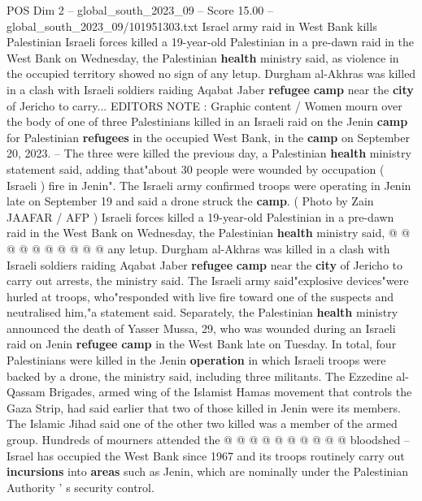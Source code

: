 \begin{textsample}{POS Dim 2 – global\_south\_2023\_09 – Score 15.00 – global\_south\_2023\_09/101951303.txt}  \label{ex:f2_pos_441}
Israel army raid in West Bank kills Palestinian Israeli forces killed a 19-year-old Palestinian in a pre-dawn raid in the West Bank on Wednesday, the Palestinian \textbf{health} ministry said, as violence in the occupied territory showed no sign of any letup.
Durgham al-Akhras was killed in a clash with Israeli soldiers raiding Aqabat Jaber \textbf{refugee} \textbf{camp} near the \textbf{city} of Jericho to carry...
EDITORS NOTE : Graphic content / Women mourn over the body of one of three Palestinians killed in an Israeli raid on the Jenin \textbf{camp} for Palestinian \textbf{refugees} in the occupied West Bank, in the \textbf{camp} on September 20, 2023. -- The three were killed the previous day, a Palestinian \textbf{health} ministry statement said, adding that"about 30 people were wounded by occupation ( Israeli ) fire in Jenin".
The Israeli army confirmed troops were operating in Jenin late on September 19 and said a drone struck the \textbf{camp}. ( Photo by Zain JAAFAR / AFP ) Israeli forces killed a 19-year-old Palestinian in a pre-dawn raid in the West Bank on Wednesday, the Palestinian \textbf{health} ministry said, @ @ @ @ @ @ @ @ @ @ any letup.
Durgham al-Akhras was killed in a clash with Israeli soldiers raiding Aqabat Jaber \textbf{refugee} \textbf{camp} near the \textbf{city} of Jericho to carry out arrests, the ministry said.
The Israeli army said"explosive devices"were hurled at troops, who"responded with live fire toward one of the suspects and neutralised him,"a statement said.
Separately, the Palestinian \textbf{health} ministry announced the death of Yasser Mussa, 29, who was wounded during an Israeli raid on Jenin \textbf{refugee} \textbf{camp} in the West Bank late on Tuesday.
In total, four Palestinians were killed in the Jenin \textbf{operation} in which Israeli troops were backed by a drone, the ministry said, including three militants.
The Ezzedine al-Qassam Brigades, armed wing of the Islamist Hamas movement that controls the Gaza Strip, had said earlier that two of those killed in Jenin were its members.
The Islamic Jihad said one of the other two killed was a member of the armed group.
Hundreds of mourners attended the @ @ @ @ @ @ @ @ @ @ bloodshed -- Israel has occupied the West Bank since 1967 and its troops routinely carry out \textbf{incursions} into \textbf{areas} such as Jenin, which are nominally under the Palestinian Authority ' s security control.

\end{textsample}
